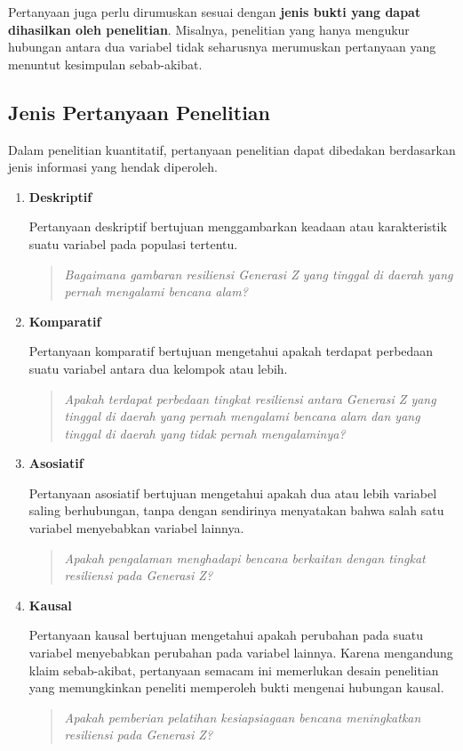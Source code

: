 \documentclass[
  indonesian,
  letterpaper,
  DIV=11,
  numbers=noendperiod]{scrreprt}
\begin{document}
Pertanyaan juga perlu dirumuskan sesuai dengan \textbf{jenis bukti yang
dapat dihasilkan oleh penelitian}. Misalnya, penelitian yang hanya
mengukur hubungan antara dua variabel tidak seharusnya merumuskan
pertanyaan yang menuntut kesimpulan sebab-akibat.

\subsection{Jenis Pertanyaan
Penelitian}\label{jenis-pertanyaan-penelitian}

Dalam penelitian kuantitatif, pertanyaan penelitian dapat dibedakan
berdasarkan jenis informasi yang hendak diperoleh.

\begin{enumerate}
\def\labelenumi{\arabic{enumi}.}
\item
  \textbf{Deskriptif}

  Pertanyaan deskriptif bertujuan menggambarkan keadaan atau
  karakteristik suatu variabel pada populasi tertentu.

  \begin{quote}
  \emph{Bagaimana gambaran resiliensi Generasi Z yang tinggal di daerah
  yang pernah mengalami bencana alam?}
  \end{quote}
\item
  \textbf{Komparatif}

  Pertanyaan komparatif bertujuan mengetahui apakah terdapat perbedaan
  suatu variabel antara dua kelompok atau lebih.

  \begin{quote}
  \emph{Apakah terdapat perbedaan tingkat resiliensi antara Generasi Z
  yang tinggal di daerah yang pernah mengalami bencana alam dan yang
  tinggal di daerah yang tidak pernah mengalaminya?}
  \end{quote}
\item
  \textbf{Asosiatif}

  Pertanyaan asosiatif bertujuan mengetahui apakah dua atau lebih
  variabel saling berhubungan, tanpa dengan sendirinya menyatakan bahwa
  salah satu variabel menyebabkan variabel lainnya.

  \begin{quote}
  \emph{Apakah pengalaman menghadapi bencana berkaitan dengan tingkat
  resiliensi pada Generasi Z?}
  \end{quote}
\item
  \textbf{Kausal}

  Pertanyaan kausal bertujuan mengetahui apakah perubahan pada suatu
  variabel menyebabkan perubahan pada variabel lainnya. Karena
  mengandung klaim sebab-akibat, pertanyaan semacam ini memerlukan
  desain penelitian yang memungkinkan peneliti memperoleh bukti mengenai
  hubungan kausal.

  \begin{quote}
  \emph{Apakah pemberian pelatihan kesiapsiagaan bencana meningkatkan
  resiliensi pada Generasi Z?}
  \end{quote}
\end{enumerate}
\end{document}
